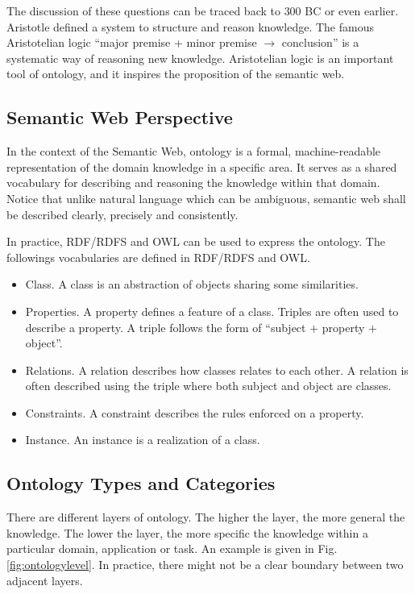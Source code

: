 The discussion of these questions can be traced back to $300$ BC or even earlier. Aristotle defined a system to structure and reason knowledge. The famous Aristotelian logic ``major premise + minor premise $\rightarrow$ conclusion'' is a systematic way of reasoning new knowledge. Aristotelian logic is an important tool of ontology, and it inspires the proposition of the semantic web.


\subsection{Semantic Web Perspective}

In the context of the Semantic Web, ontology is a formal, machine-readable representation of the domain knowledge in a specific area. It serves as a shared vocabulary for describing and reasoning the knowledge within that domain. Notice that unlike natural language which can be ambiguous, semantic web shall be described clearly, precisely and consistently.

In practice, RDF/RDFS and OWL can be used to express the ontology. The followings vocabularies are defined in RDF/RDFS and OWL.
\begin{itemize}
  \item Class. A class is an abstraction of objects sharing some similarities.
  \item Properties. A property defines a feature of a class. Triples are often used to describe a property. A triple follows the form of ``subject $+$ property $+$ object''.
  \item Relations. A relation describes how classes relates to each other. A relation is often described using the triple where both subject and object are classes.
  \item Constraints. A constraint describes the rules enforced on a property.
  \item Instance. An instance is a realization of a class.
\end{itemize}

\subsection{Ontology Types and Categories}

There are different layers of ontology. The higher the layer, the more general the knowledge. The lower the layer, the more specific the knowledge within a particular domain, application or task. An example is given in Fig. \ref{fig:ontologylevel}. In practice, there might not be a clear boundary between two adjacent layers.

